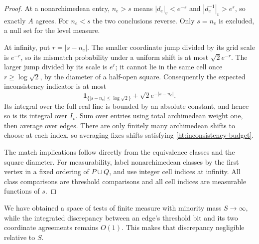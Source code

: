 \begin{proof}
At a nonarchimedean entry, $n_e>s$ means
$|d_e|_v<e^{-s}$ and $|d_e^{-1}|_v>e^s$, so exactly $A$ agrees.
For $n_e<s$ the two conclusions reverse. Only $s=n_e$ is excluded,
a null set for the level measure.

At infinity, put $r=|s-n_e|$. The smaller coordinate jump divided by
its grid scale is $e^{-r}$, so its mismatch probability under a uniform
shift is at most $\sqrt2e^{-r}$. The larger jump divided by its scale
is $e^r$; it cannot lie in the same cell once $r\ge\log\sqrt2$,
by the diameter of a half-open square. Consequently the expected
inconsistency indicator is at most
\[
 \mathbf1_{\{|s-n_e|\le\log\sqrt2\}}+
                       \sqrt2e^{-|s-n_e|}.
\]
Its integral over the full real line is bounded by an absolute constant,
and hence so is its integral over $I_v$. Sum over entries using total
archimedean weight one, then average over edges. There are only finitely
many archimedean shifts to choose at each index, so averaging fixes
shifts satisfying \eqref{ht:inconsistency-budget}.

The match implications follow directly from the equivalence classes and
the square diameter. For measurability, label nonarchimedean classes by
the first vertex in a fixed ordering of $P\cup Q$, and use integer cell
indices at infinity. All class comparisons are threshold comparisons
and all cell indices are measurable functions of $s$.
\end{proof}

We have obtained a space of tests of finite measure with minority
mass $S\to\infty$, while the integrated discrepancy between an edge's
threshold bit and its two coordinate agreements remains $O(1)$.
This makes that discrepancy negligible relative to $S$.
